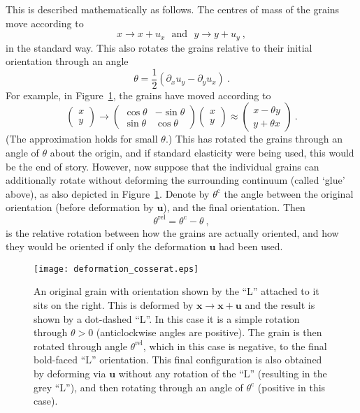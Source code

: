 \documentclass[]{scrreprt}
\newcommand{\mand}{\ \ \ \mbox{and}\ \ \ }
\newcommand{\pl}{\partial}
\newcommand{\ha}{\mbox{$\frac{1}{2}$}}
\newcommand{\thetac}{\theta^{\mathrm{c}}}
\newcommand{\thetarel}{\theta^{\mathrm{rel}}}
\begin{document}
This is described mathematically as follows.  The centres of mass of
the grains move according to
$$
x \rightarrow x + u_{x} \mand y\rightarrow y+ u_{y} \ ,
$$
in the standard way.  This also rotates the grains relative to their
initial orientation through an angle
$$
\theta = \ha(\pl_{x}u_{y}-\pl_{y}u_{x}) \ .
$$
For example, in Figure~\ref{deformation_cosserat.fig}, the grains have
moved according to
\begin{equation}
\left(\begin{array}{c}x\\y\end{array}\right) \rightarrow
\left(\begin{array}{cc}\cos\theta & -\sin\theta \\ \sin\theta & \cos\theta
\end{array}\right)
\left(\begin{array}{c}x\\y\end{array}\right)
\approx
\left(\begin{array}{c}x - \theta y\\y + \theta x\end{array}\right)   \ .
\label{rigid.rot.eqn}
\end{equation}
(The approximation holds for small $\theta$.)  This has rotated the
grains through an angle of $\theta$ about the origin, and if standard
elasticity were being used, this would be the end of story.  However,
now suppose that the individual grains can additionally rotate without
deforming the surrounding continuum (called `glue' above), as also
depicted in Figure~\ref{deformation_cosserat.fig}.  Denote by
$\thetac$ the angle between the original orientation (before
deformation by ${\mathbf u}$), and the final orientation.  Then
$$
\thetarel = \thetac - \theta \ ,
$$
is the relative rotation between how the grains are actually oriented,
and how they would be oriented if only the deformation ${\mathbf u}$
had been used.

\begin{figure}[htb]
\begin{center}
\texttt{[image: deformation\_cosserat.eps]}
\caption{An original grain with orientation shown by the ``L''
  attached to it sits on the right.  This is deformed by ${\mathbf
  x}\rightarrow {\mathbf x}+{\mathbf u}$ and the result is shown by a
  dot-dashed ``L''.  In this case it is a simple rotation through
  $\theta>0$ (anticlockwise angles are positive).  The grain is then
  rotated through angle $\thetarel$, which in this case is negative, to
  the final bold-faced ``L'' orientation.  This final configuration is
  also obtained by deforming via ${\mathbf u}$ without any rotation of
  the ``L'' (resulting in the grey ``L''), and then rotating through
  an angle of $\thetac$ (positive in this case).}
\label{deformation_cosserat.fig}
\end{center}
\end{figure}
\end{document}
